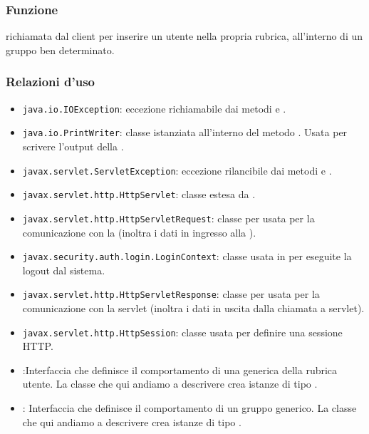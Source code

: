 

\subsubsection*{Funzione}
 richiamata dal client per inserire un utente nella propria rubrica, all'interno di un gruppo ben determinato.

\subsubsection*{Relazioni d'uso}

\begin{itemize}
	\item \texttt{java.io.IOException}: eccezione richiamabile dai metodi  e .
	\item \texttt{java.io.PrintWriter}: classe istanziata all'interno del metodo . Usata per scrivere l'output della .
	\item \texttt{javax.servlet.ServletException}: eccezione rilancibile dai metodi  e .
	\item \texttt{javax.servlet.http.HttpServlet}: classe estesa da .
	\item \texttt{javax.servlet.http.HttpServletRequest}:  classe per usata per la comunicazione con la  (inoltra i dati in ingresso alla ).
	\item \texttt{javax.security.auth.login.LoginContext}: classe usata in  per eseguite la logout dal sistema.
	\item \texttt{javax.servlet.http.HttpServletResponse}: classe per usata per la comunicazione con la servlet (inoltra i dati in uscita dalla chiamata a servlet).
	\item \texttt{javax.servlet.http.HttpSession}: classe usata per definire una sessione HTTP.
	\item {}:Interfaccia che definisce il comportamento di una generica  della rubrica utente. La classe che qui andiamo a descrivere crea istanze di tipo .
	\item {}:
Interfaccia che definisce il comportamento di un gruppo generico. La classe che qui andiamo a descrivere crea istanze di tipo .

\end{itemize}
